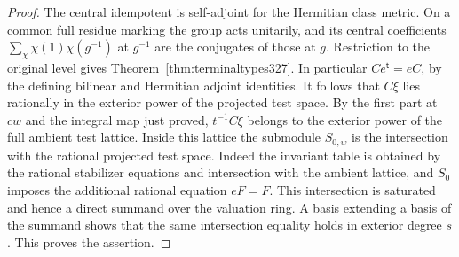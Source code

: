 \documentclass[a4paper,11pt]{article}
\theoremstyle{definition}
\theoremstyle{remark}
\numberwithin{equation}{section}
\begin{document}
\begin{proof}
The central idempotent is self-adjoint for the Hermitian class
metric. On a common full residue marking the group acts
unitarily, and its central coefficients
\(\sum_\chi\chi(1)\chi(g^{-1})\) at \(g^{-1}\) are the conjugates
of those at \(g\). Restriction to the original level gives
Theorem~\ref{thm:terminaltypes327}. In particular
\(C e^{\mathsf t}=e C\), by the defining bilinear and Hermitian
adjoint identities. It follows that \(C\xi\) lies rationally in
the exterior power of the projected test space. By the first
part at \(cw\) and the integral map just proved, \(t^{-1}C\xi\)
belongs to the exterior power of the full ambient test lattice.
Inside this lattice the submodule \(S_{0,w}\) is the intersection
with the rational projected test space. Indeed the invariant table
is obtained by the rational stabilizer equations and intersection
with the ambient lattice, and \(S_0\) imposes the additional
rational equation \(eF=F\). This intersection is saturated and
hence a direct summand over the valuation ring. A basis extending
a basis of the summand shows that the same intersection equality
holds in exterior degree \(s\). This proves the assertion.
\end{proof}
\end{document}
